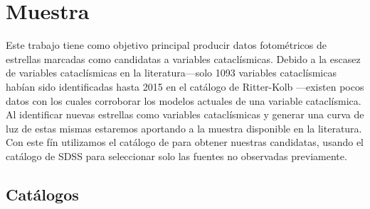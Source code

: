 \chapter{Muestra}

Este trabajo tiene como objetivo principal producir datos fotométricos de
estrellas marcadas como candidatas a variables cataclísmicas. Debido a la
escasez de variables cataclísmicas en la literatura---solo 1093 variables
cataclísmicas habían sido identificadas hasta 2015 en el catálogo de Ritter-Kolb
\citet*{ritterKolbImpactArticle}---existen pocos datos con los cuales corroborar
los modelos actuales de una variable cataclísmica. Al identificar nuevas
estrellas como variables cataclísmicas y generar una curva de luz de estas
mismas estaremos aportando a la muestra disponible en la literatura. Con este
fín utilizamos el catálogo de \gaia para obtener nuestras candidatas, usando el
catálogo de SDSS para seleccionar solo las fuentes no observadas previamente. 

\section{Catálogos}




